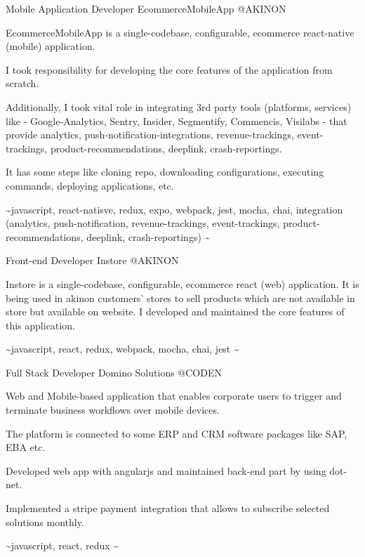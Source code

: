 \begin{cventries}
  \cventry
    {Mobile Application Developer} %
    {EcommerceMobileApp} %
    {@AKINON} %
    {}
    {
      \begin{cvitems} %
        \item {EcommerceMobileApp is a single-codebase, configurable, ecommerce react-native (mobile) application.}
        \item {I took responsibility for developing the core features of the application from scratch.}
        \item {Additionally, I took vital role in integrating 3rd party tools (platforms, services) like - Google-Analytics, Sentry, Insider, Segmentify, Commencis, Visilabs - that provide analytics, push-notification-integrations, revenue-trackings, event-trackings, product-recommendations, deeplink, crash-reportings.}
        \item {It has some steps like cloning repo, downloading configurations, executing commands, deploying applications, etc.}
        \item {\textasciitilde javascript, react-natisve, redux, expo, webpack, jest, mocha, chai, integration (analytics, push-notification, revenue-trackings, event-trackings, product-recommendations, deeplink, crash-reportings) \textasciitilde}
      \end{cvitems}
    }

  \cventry
    {Front-end Developer} %
    {Instore} %
    {@AKINON} %
    {}
    {
      \begin{cvitems} %
        \item {Instore is a single-codebase, configurable, ecommerce react (web) application. It is being used in akinon customers' stores to sell products which are not available in store but available on website. I developed and maintained the core features of this application.}
        \item {\textasciitilde javascript, react, redux, webpack, mocha, chai, jest \textasciitilde}
      \end{cvitems}
    }

  \cventry
    {Full Stack Developer} %
    {Domino Solutions} %
    {@CODEN} %
    {}
    {
      \begin{cvitems} %
        \item {Web and Mobile-based application that enables corporate users to trigger and terminate business workflows over mobile devices.}
        \item {The platform is connected to some ERP and CRM software packages like SAP, EBA etc.}
        \item {Developed web app with angularjs and maintained back-end part by using dot-net.}
        \item {Implemented a stripe payment integration that allows to subscribe selected solutions monthly.}
        \item {\textasciitilde javascript, react, redux \textasciitilde}
      \end{cvitems}
    }


\end{cventries}
